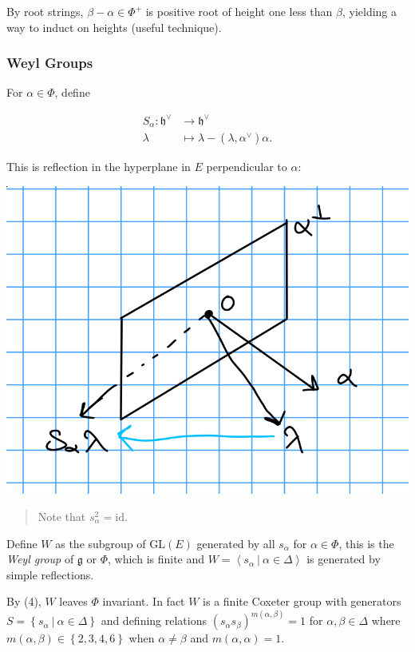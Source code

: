 \documentclass[11pt]{scrartcl}
\theoremstyle{definition}
\theoremstyle{theorem}
\theoremstyle{proof}
\theoremstyle{definition}
\theoremstyle{break}
\theoremstyle{problem}
\newcommand{\gl}[0]{\mathrm{GL}}
\newcommand{\id}[0]{\text{id}}
\newcommand{\dual}[0]{^\vee}
\newcommand{\generators}[1]{\left\langle{#1}\right\rangle}
\newcommand{\lieg}[0]{{\mathfrak{g}}}
\newcommand{\lieh}[0]{{\mathfrak{h}}}
\newcommand{\suchthat}[0]{{~\mathrel{\Big|}~}}
\newcommand{\theset}[1]{\left\{{#1}\right\}}
\renewcommand{\to}[0]{\longrightarrow}
\begin{document}
By root strings, \(\beta-\alpha\in\Phi^+\) is positive root of height
one less than \(\beta\), yielding a way to induct on heights (useful
technique).

\hypertarget{weyl-groups}{%
\subsubsection{Weyl Groups}\label{weyl-groups}}

For \(\alpha \in \Phi\), define

\begin{align*}
S_\alpha : \lieh\dual &\to \lieh\dual \\
\lambda &\mapsto \lambda - (\lambda, \alpha\dual)\alpha
.\end{align*}

This is reflection in the hyperplane in \(E\) perpendicular to
\(\alpha\):

\includegraphics{figures/2020-01-10-09:51.png}\\

\begin{quote}
Note that \(s_\alpha^2 = \id\).
\end{quote}

Define \(W\) as the subgroup of \(\gl(E)\) generated by all \(s_\alpha\)
for \(\alpha \in \Phi\), this is the \emph{Weyl group} of \(\lieg\) or
\(\Phi\), which is finite and
\(W = \generators{s_\alpha \suchthat \alpha\in\Delta}\) is generated by
simple reflections.

By (4), \(W\) leaves \(\Phi\) invariant. In fact \(W\) is a finite
Coxeter group with generators
\(S = \theset{s_\alpha \suchthat \alpha\in \Delta}\) and defining
relations \((s_\alpha s_\beta)^{m(\alpha, \beta)} = 1\) for
\(\alpha,\beta \in \Delta\) where
\(m(\alpha, \beta) \in \theset{2,3,4,6}\) when \(\alpha \neq \beta\) and
\(m(\alpha, \alpha) = 1\).
\end{document}
